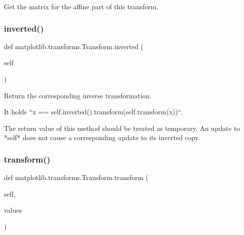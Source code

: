 \begin{DoxyVerb}Get the matrix for the affine part of this transform.\end{DoxyVerb}
 \mbox{\label{classmatplotlib_1_1transforms_1_1Transform_a0da24d34489dd79c2dade8c51e2e2582}} 
\subsubsection{\texorpdfstring{inverted()}{inverted()}}
{\footnotesize\ttfamily def matplotlib.\+transforms.\+Transform.\+inverted (\begin{DoxyParamCaption}\item[{}]{self }\end{DoxyParamCaption})}

\begin{DoxyVerb}Return the corresponding inverse transformation.

It holds ``x == self.inverted().transform(self.transform(x))``.

The return value of this method should be treated as
temporary.  An update to *self* does not cause a corresponding
update to its inverted copy.
\end{DoxyVerb}
 \mbox{\label{classmatplotlib_1_1transforms_1_1Transform_a8ed5dd2238236f5f238726473f93942d}} 
\subsubsection{\texorpdfstring{transform()}{transform()}}
{\footnotesize\ttfamily def matplotlib.\+transforms.\+Transform.\+transform (\begin{DoxyParamCaption}\item[{}]{self,  }\item[{}]{values }\end{DoxyParamCaption})}

